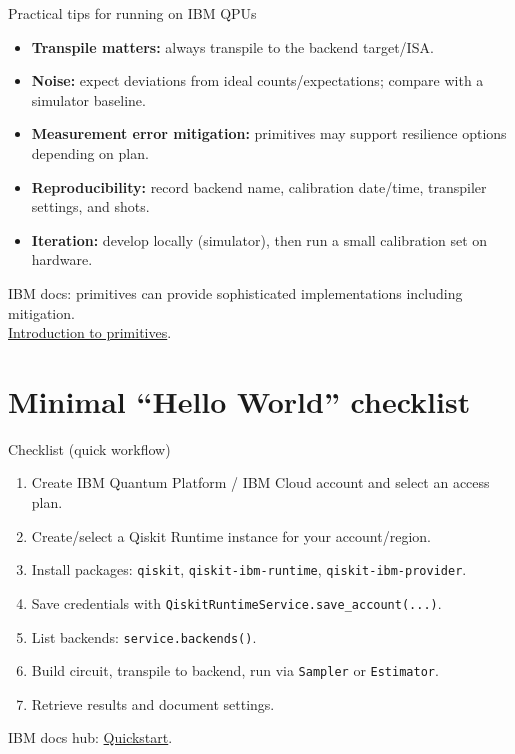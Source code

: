 \documentclass{beamer}
\begin{document}
\begin{frame}{Practical tips for running on IBM QPUs}
\begin{itemize}
  \item \textbf{Transpile matters:} always transpile to the backend target/ISA.
  \item \textbf{Noise:} expect deviations from ideal counts/expectations; compare with a simulator baseline.
  \item \textbf{Measurement error mitigation:} primitives may support resilience options depending on plan.
  \item \textbf{Reproducibility:} record backend name, calibration date/time, transpiler settings, and shots.
  \item \textbf{Iteration:} develop locally (simulator), then run a small calibration set on hardware.
\end{itemize}

\vspace{0.4em}
\scriptsize
IBM docs: primitives can provide sophisticated implementations including mitigation.\\
\href{https://qiskit.qotlabs.org/docs/guides/primitives}{Introduction to primitives}.%
\end{frame}

\section{Minimal ``Hello World'' checklist}

\begin{frame}{Checklist (quick workflow)}
\begin{enumerate}
  \item Create IBM Quantum Platform / IBM Cloud account and select an access plan.
  \item Create/select a Qiskit Runtime instance for your account/region.
  \item Install packages: \texttt{qiskit}, \texttt{qiskit-ibm-runtime}, \texttt{qiskit-ibm-provider}.
  \item Save credentials with \texttt{QiskitRuntimeService.save\_account(...)}.
  \item List backends: \texttt{service.backends()}.
  \item Build circuit, transpile to backend, run via \texttt{Sampler} or \texttt{Estimator}.
  \item Retrieve results and document settings.
\end{enumerate}

\vspace{0.4em}
\scriptsize
IBM docs hub: \href{https://quantum.cloud.ibm.com/docs/guides/quick-start}{Quickstart}.%
\end{frame}
\end{document}
